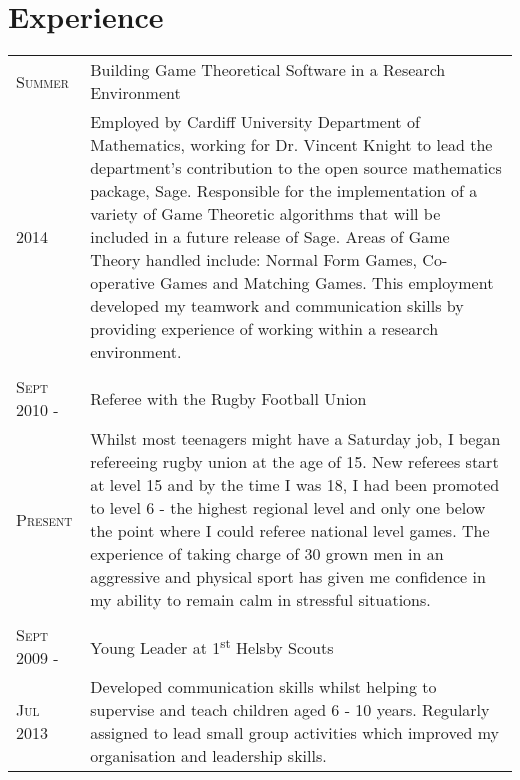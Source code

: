 \documentclass[a4paper, 11pt]{article}
\begin{document}
\section{Experience}
\begin{tabularx}{\textwidth}{lX}

\textsc{Summer} & Building Game Theoretical Software in a Research Environment \\
\textsc{2014}& \footnotesize{Employed by Cardiff University Department of Mathematics, working for Dr. Vincent Knight to lead the department's contribution to the open source mathematics package, Sage. Responsible for the implementation of a variety of Game Theoretic algorithms that will be included in a future release of Sage. Areas of Game Theory handled include: Normal Form Games, Co-operative Games and Matching Games. This employment developed my teamwork and communication skills by providing experience of working within a research environment.}\\
\\
\textsc{Sept 2010 -} & Referee with the Rugby Football Union \\
\textsc{Present} & \footnotesize{Whilst most teenagers might have a Saturday job, I began refereeing rugby union at the age of 15. New referees start at level 15 and by the time I was 18, I had been promoted to level 6 - the highest regional level and only one below the point where I could referee national level games. The experience of taking charge of 30 grown men in an aggressive and physical sport has given me confidence in my ability to remain calm in stressful situations.}\\
\\
\textsc{Sept 2009 -} & Young Leader at 1\textsuperscript{st} Helsby Scouts\\
\textsc{Jul 2013}& \footnotesize{Developed communication skills whilst helping to supervise and teach children aged 6 - 10 years. Regularly assigned to lead small group activities which improved my organisation and leadership skills.}\\

\end{tabularx}
\end{document}
